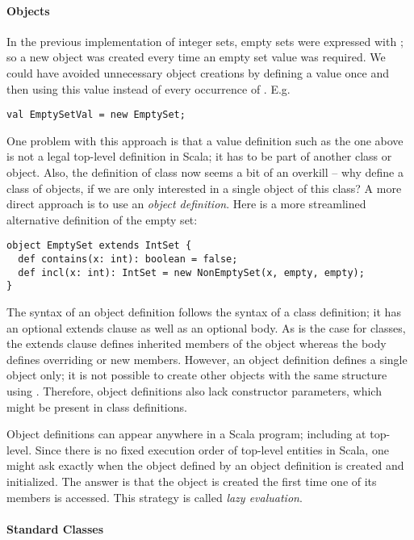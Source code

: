 \documentclass[a4paper,12pt,twoside,titlepage]{book}
\begin{document}
\paragraph{Objects}

In the previous implementation of integer sets, empty sets were
expressed with ; so a new object was created every time
an empty set value was required. We could have avoided unnecessary
object creations by defining a value  once and then using
this value instead of every occurrence of . E.g.
\begin{lstlisting}
val EmptySetVal = new EmptySet;
\end{lstlisting}
One problem with this approach is that a value definition such as the
one above is not a legal top-level definition in Scala; it has to be
part of another class or object. Also, the definition of class
 now seems a bit of an overkill -- why define a class of objects, 
if we are only interested in a single object of this class? A more
direct approach is to use an {\em object definition}. Here is
a more streamlined alternative definition of the empty set:
\begin{lstlisting}
object EmptySet extends IntSet {
  def contains(x: int): boolean = false;
  def incl(x: int): IntSet = new NonEmptySet(x, empty, empty);
}
\end{lstlisting}
The syntax of an object definition follows the syntax of a class
definition; it has an optional extends clause as well as an optional
body. As is the case for classes, the extends clause defines inherited
members of the object whereas the body defines overriding or new
members.  However, an object definition defines a single object only;
it is not possible to create other objects with the same structure
using .  Therefore, object definitions also lack constructor
parameters, which might be present in class definitions.

Object definitions can appear anywhere in a Scala program; including
at top-level.  Since there is no fixed execution order of top-level
entities in Scala, one might ask exactly when the object defined by an
object definition is created and initialized. The answer is that the
object is created the first time one of its members is accessed. This
strategy is called {\em lazy evaluation}.

\paragraph{Standard Classes}
\end{document}
